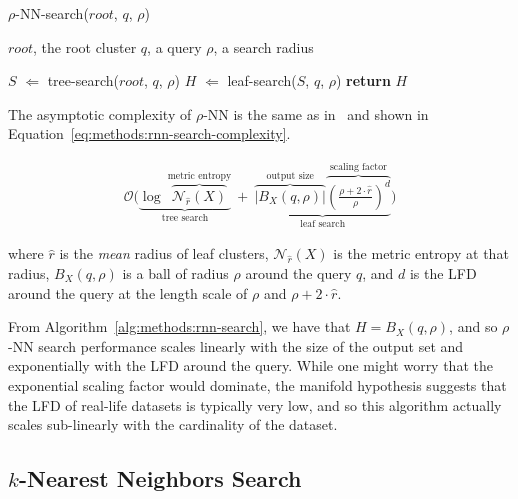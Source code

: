 \begin{algorithm} 
    \caption{$\rho$-NN-search($root$, $q$, $\rho$)} 
    \label{alg:methods:rnn-search} 
    \begin{algorithmic}
        \REQUIRE $root$, the root cluster
        \REQUIRE $q$, a query
        \REQUIRE $\rho$, a search radius

        \STATE $S$ $\Leftarrow$ tree-search($root$, $q$, $\rho$)
        \STATE $H$ $\Leftarrow$ leaf-search($S$, $q$, $\rho$)
        \STATE \textbf{return} $H$
    \end{algorithmic}
\end{algorithm}

The asymptotic complexity of $\rho$-NN is the same as in~\cite{ishaq2019clustered} and shown in Equation~\ref{eq:methods:rnn-search-complexity}.

\begin{gather}
    \mathcal{O}
    \Bigg(
        \underbrace{
            \log~\overbrace{\mathcal{N}_{\hat{r}}(X)}^{\textrm{metric entropy}}
        }_{\textrm{tree search}}
        \ + \ 
        \underbrace{
            \overbrace{ \big| B_X(q, \rho) \big|}^{\textrm{output size}}
            \overbrace{ \left( \frac{\rho + 2 \cdot \hat{r}}{ \rho} \right) ^ d}^{\textrm{scaling factor}}
        }_{\textrm{leaf search}}
    \Bigg)
    \label{eq:methods:rnn-search-complexity}
\end{gather}

where $\hat{r}$ is the \textit{mean} radius of leaf clusters, $\mathcal{N}_{\hat{r}}(X)$ is the metric entropy at that radius, $B_X(q, \rho)$ is a ball of radius $\rho$ around the query $q$, and $d$ is the LFD around the query at the length scale of $\rho$ and $\rho + 2 \cdot \hat{r}$.

From Algorithm~\ref{alg:methods:rnn-search}, we have that $H = B_X(q, \rho)$, and so $\rho$-NN search performance scales linearly with the size of the output set and exponentially with the LFD around the query.
While one might worry that the exponential scaling factor would dominate, the manifold hypothesis suggests that the LFD of real-life datasets is typically very low, and so this algorithm actually scales sub-linearly with the cardinality of the dataset.


\subsection{\texorpdfstring{$k$}{k}-Nearest Neighbors Search}
\label{sec:methods:knn-search}

